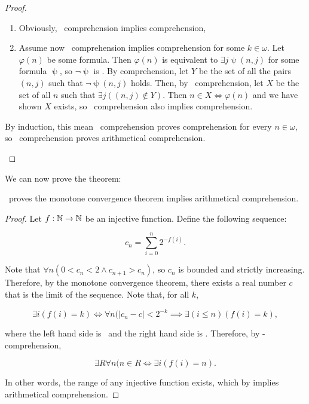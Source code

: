 \documentclass[../main.tex]{memoir}
\begin{document}
\begin{proof}
\begin{description}
    \begin{enumerate}
    \item Obviously, \re\ comprehension implies  comprehension,
    \item Assume now \re\ comprehension implies  comprehension for some $k \in \omega$. Let $\varphi(n)$ be some  formula. Then $\varphi(n)$ is equivalent to $\exists j \uppsi(n, j)$ for some  formula $\uppsi$, so $\neg \uppsi$ is . By  comprehension, let $Y$ be the set of all the pairs $(n, j)$ such that $\neg \uppsi(n, j)$ holds. Then, by \re\ comprehension, let $X$ be the set of all $n$ such that $\exists j ((n, j) \not\in Y)$. Then $n \in X \iff \varphi(n)$ and we have shown $X$ exists, so \re\ comprehension also implies  comprehension.
    \end{enumerate}

    By induction, this mean \re\ comprehension proves  comprehension for every $n \in \omega$, so \re\ comprehension proves arithmetical comprehension.
  \end{description}
\end{proof}

We can now prove the theorem:

\begin{theorem}
  \label{thm:mc-aca}
  \rca\ proves the monotone convergence theorem implies arithmetical comprehension.
\end{theorem}
\begin{proof}
  Let $f:\mathbb{N} \to \mathbb{N}$ be an injective function. Define the following sequence:

  \[ c_n = \sum_{i = 0}^n 2^{-f(i)}. \]

  Note that $\forall n (0 < c_n < 2 \land c_{n + 1} > c_n)$, so $c_n$ is bounded and strictly increasing. Therefore, by the monotone convergence theorem, there exists a real number $c$ that is the limit of the sequence. Note that, for all $k$,

  \[ \exists i (f(i) = k) \iff \forall n (|c_n - c| < 2^{-k} \implies \exists (i \le n) (f(i) = k), \]

  where the left hand side is \re\ and the right hand side is \core. Therefore, by \rec-comprehension,

  \[ \exists R \forall n (n \in R \iff \exists i (f(i) = n). \]

  In other words, the range of any injective function exists, which by  implies arithmetical comprehension.
\end{proof}
\end{document}
